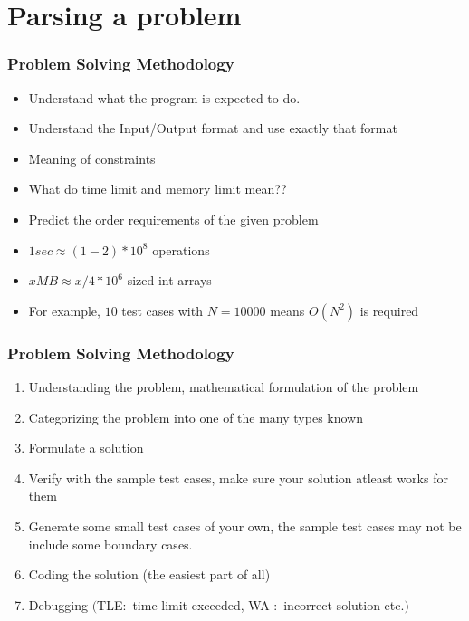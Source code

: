 \documentclass{beamer}
\begin{document}
\section{Parsing a problem}
\newcommand\XOR{\mathbin{\char`\^}}
\begin{frame}
	\frametitle{Problem Solving Methodology}
\begin{itemize}
\item Understand what the program is expected to do.
\pause
\item Understand the Input/Output format and use exactly that format
\pause
\item Meaning of constraints
\pause
\item What do time limit and memory limit mean??
\pause
\item Predict the order requirements of the given problem
\pause
\item $1 sec \approx (1 - 2) \ast 10^8$ operations
\pause
\item $x MB \approx x/4 \ast 10^6$ sized int arrays
\pause
\item For example, $10$ test cases with $N=10000$
means $O(N^2)$ is required
\end{itemize}
\end{frame}

\begin{frame}[<+->]
	\frametitle{Problem Solving Methodology}
\begin{enumerate}
\item Understanding the problem, mathematical formulation of the problem
\item Categorizing the problem into one of the many types
known
\item Formulate a solution
\item Verify with the sample test cases, make sure your solution atleast works for them
\item Generate some small test cases of your own, the sample test cases may not be include some boundary cases.
\item Coding the solution (the easiest part of all)
\item Debugging $($TLE$:$ time limit exceeded, WA $:$ incorrect solution etc$.)$
\end{enumerate}

\end{frame}
\end{document}
